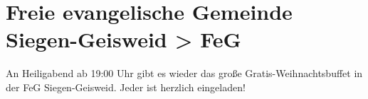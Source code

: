 \section{Freie evangelische Gemeinde Siegen-Geisweid > FeG}
An Heiligabend ab 19:00 Uhr gibt es wieder das große Gratis-Weihnachtsbuffet in der FeG Siegen-Geisweid. Jeder ist herzlich eingeladen!